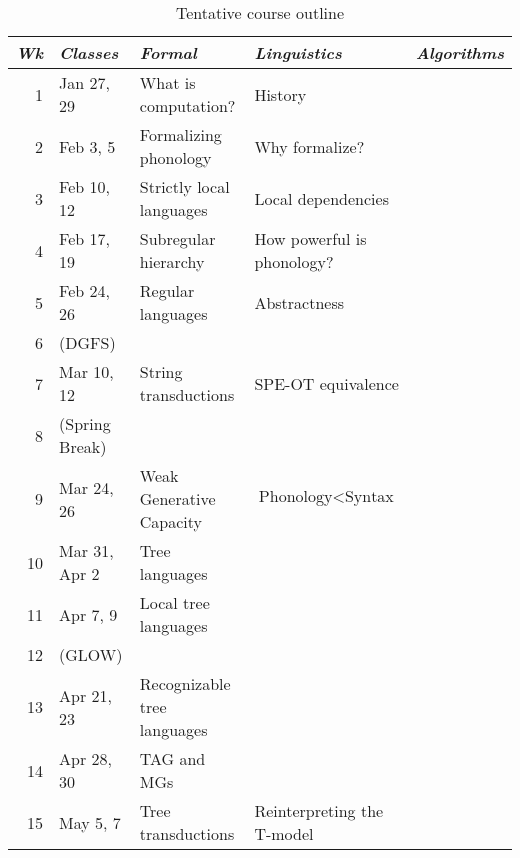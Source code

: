 \begin{table}
    \centering
    \begin{tabular}{rlp{4.5cm}p{4.5cm}p{4cm}}
        \hline
        \hline
        \emph{Wk} & \emph{Classes} & \emph{Formal} & \emph{Linguistics} & \emph{Algorithms}\\\hline
        1         & Jan 27, 29     & What is computation? & History\\
        2         & Feb 3, 5       & Formalizing phonology & Why formalize?\\
        3         & Feb 10, 12     & Strictly local languages & Local dependencies\\
        4         & Feb 17, 19     & Subregular hierarchy & How powerful is phonology?\\
        5         & Feb 24, 26     & Regular languages & Abstractness\\
        6         & (DGFS)         & & \\
        7         & Mar 10, 12     & String transductions & SPE-OT equivalence\\
        \hline                       
        8         & (Spring Break) & & \\
        \hline                       
        9         & Mar 24, 26     & Weak Generative Capacity & $\text{Phonology} < \text{Syntax}$\\
        10        & Mar 31, Apr 2  & Tree languages & \\
        11        & Apr 7, 9       & Local tree languages & \\
        12        & (GLOW)         & & \\
        13        & Apr 21, 23     & Recognizable tree languages & \\
        14        & Apr 28, 30     & TAG and MGs & \\
        15        & May 5, 7       & Tree transductions & Reinterpreting the T-model\\
        \hline
        \hline
    \end{tabular}
\caption{Tentative course outline}
\end{table}


